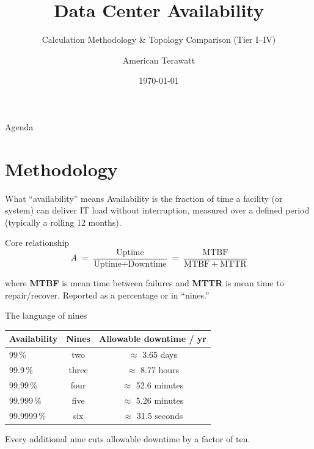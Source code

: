 \documentclass[aspectratio=169,10pt]{beamer}
\title{Data Center Availability}
\subtitle{Calculation Methodology \& Topology Comparison (Tier I--IV)}
\author{American Terawatt}
\date{\today}
\begin{document}
\maketitle

\begin{frame}{Agenda}
  \tableofcontents
\end{frame}

\section{Methodology}

\begin{frame}{What ``availability'' means}
  Availability is the fraction of time a facility (or system) can deliver IT load
  without interruption, measured over a defined period (typically a rolling 12 months).

  \vspace{0.6em}
  \begin{block}{Core relationship}
    \[
      A \;=\; \frac{\text{Uptime}}{\text{Uptime}+\text{Downtime}}
        \;=\; \frac{\mathrm{MTBF}}{\mathrm{MTBF}+\mathrm{MTTR}}
    \]
  \end{block}

  \vspace{0.3em}
  where \textbf{MTBF} is mean time between failures and \textbf{MTTR} is mean time to
  repair/recover. Reported as a percentage or in ``nines.''
\end{frame}

\begin{frame}{The language of nines}
  \centering
  \renewcommand{\arraystretch}{1.25}
  \begin{tabular}{lcc}
    \toprule
    \textbf{Availability} & \textbf{Nines} & \textbf{Allowable downtime / yr} \\
    \midrule
    99\,\%      & two   & $\approx$ 3.65 days   \\
    99.9\,\%    & three & $\approx$ 8.77 hours  \\
    99.99\,\%   & four  & $\approx$ 52.6 minutes\\
    99.999\,\%  & five  & $\approx$ 5.26 minutes\\
    99.9999\,\% & six   & $\approx$ 31.5 seconds\\
    \bottomrule
  \end{tabular}

  \vspace{1em}
  \small Every additional nine cuts allowable downtime by a factor of ten.
\end{frame}
\end{document}

